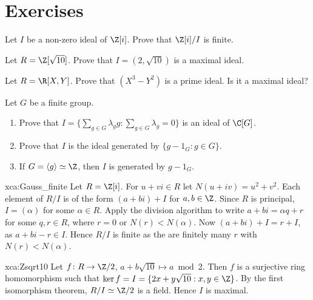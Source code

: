 \chapter*{Exercises}

\begin{exercise}
	\label{xca:Gauss_finite}
	Let $I$ be a non-zero ideal of $\Z[i]$. Prove that 
	$\Z[i]/I$ is finite.
\end{exercise}

\begin{exercise}
	\label{xca:Zsqrt10}
	Let $R=\Z[\sqrt{10}]$. Prove that $I=(2,\sqrt{10})$ is a maximal ideal. 
\end{exercise}

\begin{exercise}
	\label{xca:RXY_prime}
	Let $R=\R[X,Y]$.  Prove that $(X^3-Y^2)$ is a prime ideal. Is it a maximal
	ideal?
\end{exercise}

\begin{exercise}
	\label{xca:augmentation}
	Let $G$ be a finite group. 
	\begin{enumerate}
		\item Prove that $I=\{\sum_{g\in G}\lambda_gg:\sum_{g\in G}\lambda_g=0\}$ is an ideal of $\C[G]$.
		\item Prove that $I$ is the ideal generated by $\{g-1_G:g\in G\}$.
		\item If $G=\langle g\rangle\simeq\Z$, then $I$ is generated by $g-1_G$. 
	\end{enumerate}
\end{exercise}

\begin{sol}{xca:Gauss_finite}
	Let $R=\Z[i]$. For $u+vi\in R$ let $N(u+iv)=u^2+v^2$. 
	Each element of $R/I$ is of the form $(a+bi)+I$ for $a,b\in \Z$. Since $R$
	is principal, $I=(\alpha)$ for some $\alpha\in R$. Apply the division
	algorithm to write $a+bi=\alpha q+r$ for some $q,r\in R$, where $r=0$ or
	$N(r)<N(\alpha)$. Now $(a+bi)+I=r+I$, as $a+bi-r\in I$. Hence $R/I$ is
	finite as the are finitely many $r$ with $N(r)<N(\alpha)$. 
\end{sol}

\begin{sol}{xca:Zsqrt10}
	Let $f\colon R\to\Z/2$, $a+b\sqrt{10}\mapsto a\bmod 2$. Then $f$ is a
	surjective ring homomorphism such that $\ker
	f=I=\{2x+y\sqrt{10}:x,y\in\Z\}$. By the first isomorphism theorem,
	$R/I\simeq\Z/2$ is a field. Hence $I$ is maximal. 
\end{sol}

